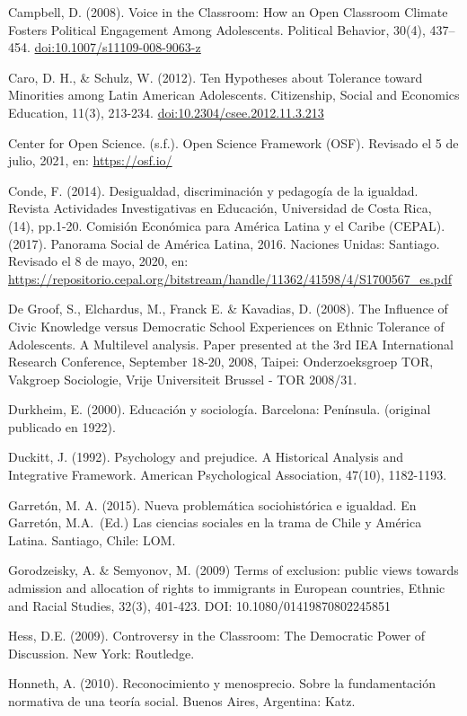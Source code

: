\documentclass[12pt,twoside]{templates/facsothesis}
\begin{document}
Campbell, D. (2008). Voice in the Classroom: How an Open Classroom Climate Fosters Political Engagement Among Adolescents. Political Behavior, 30(4), 437-- 454. \url{doi:10.1007/s11109-008-9063-z}

Caro, D. H., \& Schulz, W. (2012). Ten Hypotheses about Tolerance toward Minorities among Latin American Adolescents. Citizenship, Social and Economics Education, 11(3), 213-234. \url{doi:10.2304/csee.2012.11.3.213}

Center for Open Science. (s.f.). Open Science Framework (OSF). Revisado el 5 de julio, 2021, en: \url{https://osf.io/}

Conde, F. (2014). Desigualdad, discriminación y pedagogía de la igualdad. Revista Actividades Investigativas en Educación, Universidad de Costa Rica, (14), pp.1-20.
Comisión Económica para América Latina y el Caribe (CEPAL). (2017). Panorama Social de América Latina, 2016. Naciones Unidas: Santiago. Revisado el 8 de mayo, 2020, en: \url{https://repositorio.cepal.org/bitstream/handle/11362/41598/4/S1700567_es.pdf}

De Groof, S., Elchardus, M., Franck E. \& Kavadias, D. (2008). The Influence of Civic Knowledge versus Democratic School Experiences on Ethnic Tolerance of Adolescents. A Multilevel analysis. Paper presented at the 3rd IEA International Research Conference, September 18-20, 2008, Taipei: Onderzoeksgroep TOR, Vakgroep Sociologie, Vrije Universiteit Brussel - TOR 2008/31.

Durkheim, E. (2000). Educación y sociología. Barcelona: Península. (original publicado en 1922).

Duckitt, J. (1992). Psychology and prejudice. A Historical Analysis and Integrative Framework. American Psychological Association, 47(10), 1182-1193.

Garretón, M. A. (2015). Nueva problemática sociohistórica e igualdad. En Garretón, M.A.~(Ed.) Las ciencias sociales en la trama de Chile y América Latina. Santiago, Chile: LOM.

Gorodzeisky, A. \& Semyonov, M. (2009) Terms of exclusion: public views towards admission and allocation of rights to immigrants in European countries, Ethnic and Racial Studies, 32(3), 401-423. DOI: 10.1080/01419870802245851

Hess, D.E. (2009). Controversy in the Classroom: The Democratic Power of Discussion. New York: Routledge.

Honneth, A. (2010). Reconocimiento y menosprecio. Sobre la fundamentación normativa de una teoría social. Buenos Aires, Argentina: Katz.
\end{document}
